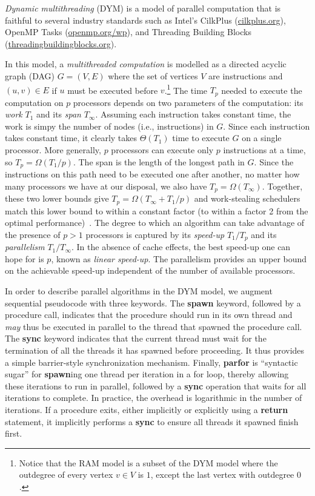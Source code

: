 {\em Dynamic multithreading} (DYM) \cite[Chapter~27]{Cormen2009} is a
model of parallel computation that is faithful to several industry standards
such as Intel's CilkPlus (\url{cilkplus.org}), OpenMP Tasks
(\url{openmp.org/wp}), and Threading Building
Blocks (\url{threadingbuildingblocks.org}).

In this model, a {\em multithreaded computation} is modelled as a directed
acyclic graph (DAG) $G=(V,E)$ where the set of vertices $V$ are instructions
and $(u,v) \in E$ if $u$ must be executed before $v$.\footnote{Notice that the
  RAM model is a subset of the DYM model where the outdegree of every
  vertex $v \in V$ is $1$, except the last vertex with outdegree $0$.}
The time $T_p$ needed to execute the computation on $p$ processors depends on
two parameters of the computation: its {\em work} $T_1$ and its {\em span}
$T_\infty$.
Assuming each instruction takes constant time, the work is simpy the number of
nodes (i.e., instructions) in $G$.
Since each instruction takes constant time, it clearly takes $\Theta(T_1)$ time
to execute $G$ on a single processor.
More generally, $p$ processors can execute only $p$ instructions at a time, so
$T_p = \Omega(T_1/p)$.
The span is the length of the longest path in $G$.
Since the instructions on this path need to be executed one after another, no
matter how many processors we have at our disposal, we also have
$T_p = \Omega(T_\infty)$.
Together, these two lower bounds give $T_p = \Omega(T_\infty + T_1/p)$ and
work-stealing schedulers match this lower bound to within a constant factor
(to within a factor 2 from the optimal
performance)~\cite{Blumofe:1999:SMC:324133.324234}.
The degree to which an algorithm can take advantage of the presence of $p > 1$
processors is captured by its {\em speed-up} $T_1 / T_p$ and its
{\em parallelism} $T_1 / T_\infty$.
In the absence of cache effects, the best speed-up one can hope for is $p$,
known as {\em linear speed-up}.
The parallelism provides an upper bound on the achievable speed-up independent
of the number of available processors.

In order to describe parallel algorithms in the DYM model, we augment sequential
pseudocode with three keywords.
The {\bf spawn} keyword, followed by a procedure call, indicates that the
procedure should run in its own thread and {\em may} thus be executed in
parallel to the thread that spawned the procedure call.
The {\bf sync} keyword indicates that the current thread must wait for the
termination of all the threads it has spawned before proceeding.
It thus provides a simple barrier-style synchronization mechanism.
Finally, {\bf parfor} is ``syntactic sugar'' for {\bf spawn}ing one thread per
iteration in a for loop, thereby allowing these iterations to run in parallel,
followed by a {\bf sync} operation that waits for all iterations to complete.
In practice, the overhead is logarithmic in the number of iterations.
If a procedure exits, either implicitly or explicitly using a {\bf return}
statement, it implicitly performs a {\bf sync} to ensure all threads it spawned
finish first.
